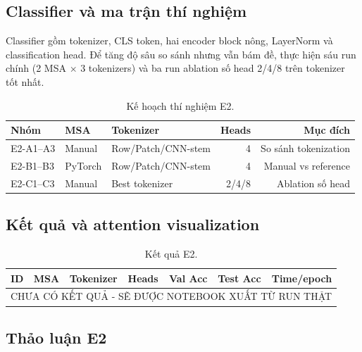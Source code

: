 \subsection{Classifier và ma trận thí nghiệm}
Classifier gồm tokenizer, CLS token, hai encoder block nông, LayerNorm và classification head. Để tăng độ sâu so sánh nhưng vẫn bám đề, thực hiện sáu run chính (2 MSA $\times$ 3 tokenizers) và ba run ablation số head 2/4/8 trên tokenizer tốt nhất.

\begin{table}[H]\centering
\caption{Kế hoạch thí nghiệm E2.}
\begin{tabular}{@{}lllrr@{}}
\toprule
Nhóm & MSA & Tokenizer & Heads & Mục đích \\
\midrule
E2-A1--A3 & Manual & Row/Patch/CNN-stem & 4 & So sánh tokenization \\
E2-B1--B3 & PyTorch & Row/Patch/CNN-stem & 4 & Manual vs reference \\
E2-C1--C3 & Manual & Best tokenizer & 2/4/8 & Ablation số head \\
\bottomrule
\end{tabular}
\end{table}

\subsection{Kết quả và attention visualization}
\begin{table}[H]\centering
\caption{Kết quả E2.}
\begin{tabular}{@{}llllrrr@{}}
\toprule
ID & MSA & Tokenizer & Heads & Val Acc & Test Acc & Time/epoch \\
\midrule
\multicolumn{7}{c}{\textcolor{TodoRed}{CHƯA CÓ KẾT QUẢ - SẼ ĐƯỢC NOTEBOOK XUẤT TỪ RUN THẬT}} \\
\bottomrule
\end{tabular}
\end{table}

\subsection{Thảo luận E2}

